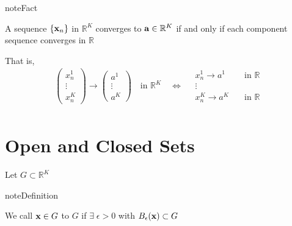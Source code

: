 \documentclass[letterpaper,10pt,english]{jupyterBook}
\begin{document}
\begin{sphinxadmonition}{note}{Fact}

\sphinxAtStartPar
A sequence \(\{{\bf x}_n\}\) in \(\mathbb{R}^K\) converges to \({\bf a} \in \mathbb{R}^K\)
if and only if each component sequence converges in \(\mathbb{R}\)

\sphinxAtStartPar
That is,
\begin{equation*}
\begin{split}
%
\begin{pmatrix}
x^1_n \\
\vdots \\
x^K_n 
\end{pmatrix}
\to
\begin{pmatrix}
a^1 \\
\vdots \\
a^K 
\end{pmatrix}
\quad \text{in } \mathbb{R}^K
\quad \iff \quad
\begin{array}{cc}
x^1_n \to a^1 & \quad \text{in } \mathbb{R} \\
\vdots & \\
x^K_n \to a^K & \quad \text{in } \mathbb{R} 
\end{array}
%
\end{split}
\end{equation*}\begin{equation*}
\begin{split}
%
\end{split}
\end{equation*}\end{sphinxadmonition}

\begin{figure}[htbp]
\centering

\noindent{}
\end{figure}


\section{Open and Closed Sets}
\label{\detokenize{06.optimization_fundamentals:open-and-closed-sets}}
\sphinxAtStartPar
Let \(G \subset \mathbb{R}^K\)

\begin{sphinxadmonition}{note}{Definition}

\sphinxAtStartPar
We call \({\bf x} \in G\)  to \(G\) if
\(\exists \; \epsilon > 0\) with \(B_\epsilon({\bf x}) \subset G\)
\end{sphinxadmonition}
\end{document}
